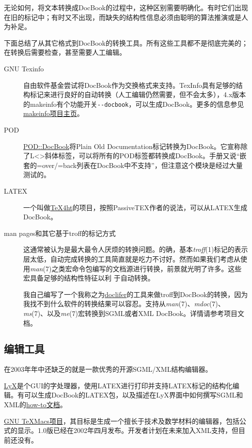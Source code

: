\documentclass[12pt,oneside]{book}
\begin{document}
无论如何，将文本转换成DocBook的过程中，这种区别需要明确化。有时它们出现在旧的标记中；有时又不出现，而缺失的结构性信息必须由聪明的算法推演或是人为补足。

下面总结了从其它格式到DocBook的转换工具。所有这些工具都不是彻底完美的；在转换后需要检查，甚至需要人工编辑。
\begin{description}
\item[GNU Texinfo] 自由软件基金尝试将DocBook作为交换格式来支持。TexInfo具有足够的结构标记来进行良好的自动转换（人工编辑仍然需要，但不会太多），4.x版本的makeinfo有个功能开关\verb+--docbook+，可以生成DocBook。更多的信息参见\href{http://www.gnu.org/directory/texinfo.html}{makeinfo项目主页}。
\item[POD] \href{http://www.cpan.org/modules/by-module/Pod/}{POD::DocBook}将Plain Old Documentation标记转换为DocBook\linebreak 。它宣称除了L<>斜体标签，可以将所有的POD标签都转换成DocBook。手册又说“嵌套的=over/=back列表在DocBook中不支持”，但注意这个模块是经过大量测试的。
\item[LATEX] 一个叫做\href{http://www.lrz-muenchen.de/services/software/sonstiges/tex4ht/mn.html}{TeX4ht}的项目，按照PassiveTEX作者的说法，可以从LATEX生成DocBook。
\item[man pages和其它基于troff的标记方式] 这通常被认为是最大最令人厌烦的转换问题。的确，基本\textit{troff}(1)标记的表示层太低，自动完成转换的工具简直就是吃力不讨好。然而如果我们考虑从使用\textit{man}(7)之类宏命令包编写的文档源进行转换，前景就光明了许多。这些宏具备足够的结构性特征以利
于自动转换。

我自己编写了一个我称之为\href{http://www.catb.org/~esr/doclifter/}{doclifer}的工具来做troff到DocBook的转换，因为我找不到什么软件的转换结果可以容忍。支持从\textit{man}(7)、\textit{mdoc}(7)、\textit{ms}(7)、以及\textit{me}(7)宏转换到SGML或者XML DocBook。详情请参考项目文档。
\end{description}

\subsection{编辑工具}
在2003年年中还缺乏的就是一款优秀的开源SGML/XML结构编辑器。

\href{http://www.lyx.org/}{LyX}是个GUI的字处理器，使用LATEX进行打印并支持LATEX标记的结构化编辑。有可以生成DocBook的LATEX包，以及描述在LyX界面中如何撰写SGML和XML的\href{http://bgu.chez.tiscali.fr/doc/db4lyx/}{how-to文档}。

\href{http://www.math.u-psud.fr/~anh/TeXmacs/TeXmacs.html}{GNU TeXMacs项目}，其目标是生成一个擅长于技术及数学材料的编辑器，包括公式的显示。1.0版已经在2002年四月发布。开发者计划在未来加入XML支持，但目前还没有。
\end{document}
